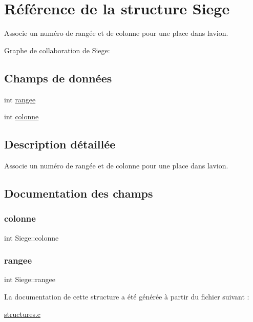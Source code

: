 \hypertarget{structSiege}{}\section{Référence de la structure Siege}
\label{structSiege}


Associe un numéro de rangée et de colonne pour une place dans l\textquotesingle{}avion.  




Graphe de collaboration de Siege\+:
\subsection*{Champs de données}
\begin{DoxyCompactItemize}
\item 
int \hyperlink{structSiege_ac5eff08518a54d38b41f1ce6f7c46c57}{rangee}
\item 
int \hyperlink{structSiege_a4f1e5f39364fc2a63f3611aedfb5de0d}{colonne}
\end{DoxyCompactItemize}


\subsection{Description détaillée}
Associe un numéro de rangée et de colonne pour une place dans l\textquotesingle{}avion. 

\subsection{Documentation des champs}
\mbox{\label{structSiege_a4f1e5f39364fc2a63f3611aedfb5de0d}} 
\subsubsection{\texorpdfstring{colonne}{colonne}}
{\footnotesize\ttfamily int Siege\+::colonne}

\mbox{\label{structSiege_ac5eff08518a54d38b41f1ce6f7c46c57}} 
\subsubsection{\texorpdfstring{rangee}{rangee}}
{\footnotesize\ttfamily int Siege\+::rangee}



La documentation de cette structure a été générée à partir du fichier suivant \+:\begin{DoxyCompactItemize}
\item 
\hyperlink{structures_8c}{structures.\+c}\end{DoxyCompactItemize}
